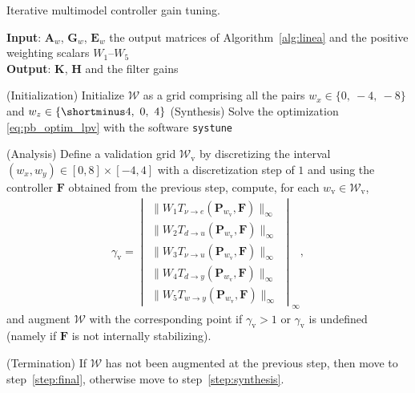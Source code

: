 \begin{algorithm}
  \caption{Iterative multimodel controller gain tuning.}
  \label{alg:iterativeOptimisation}
  \hspace*{.1cm} \textbf{Input}: $\boldsymbol{A}_{w}$, $\boldsymbol{G}_{w}$, $\boldsymbol{E}_{w}$  the output matrices of Algorithm~\ref{alg:linea} and the positive weighting scalars $W_1$--$W_5$\\
  \hspace*{.1cm} \textbf{Output}: $\boldsymbol{K}$, $\boldsymbol{H}$ and the filter gains
  \begin{algorithmic}[1]
   
    \State (Initialization) Initialize ${\mathcal W}$ as a grid comprising all the pairs $ w_{x} \in \{0,~-4,~-8\}$ and $ w_{z} \in \{\shortminus 4,~0,~4\}$
    \State \label{step:synthesis} (Synthesis) Solve the optimization \eqref{eq:pb_optim_lpv} with the software {\tt systune}

    \State \label{step:analysis} (Analysis) Define a validation grid ${\mathcal W}_{\text{v}}$ by discretizing the interval $(w_x,w_y) \in [0,8]\times[-4,4]$ with a discretization step of $1$ and 
    using the controller $\boldsymbol{F}$ obtained from the previous step, compute, for each $w_{\text{v}}\in {\mathcal W}_{\text{v}}$,
    \begin{align}
    \label{eq:validation_step}
    \gamma_{\text{v}} = \begin{vmatrix}
    \| W_{1} T_{\nu \rightarrow e}(\boldsymbol{P}_{w_{\text{v}}},\boldsymbol{F})\|_{\infty} \\
    \|W_{2} T_{d \rightarrow u}(\boldsymbol{P}_{w_{\text{v}}},\boldsymbol{F})\|_{\infty}\\
    \|W_{3} T_{\nu \rightarrow u}(\boldsymbol{P}_{w_{\text{v}}},\boldsymbol{F})\|_{\infty}\\
    \|W_{4} T_{d \rightarrow y}(\boldsymbol{P}_{w_{\text{v}}},\boldsymbol{F})\|_{\infty}\\
    \|W_{5} T_{w \rightarrow y}(\boldsymbol{P}_{w_{\text{v}}},\boldsymbol{F})\|_{\infty}
    \end{vmatrix}_{\infty} ,
    \end{align}
    and augment ${\mathcal W}$ with the corresponding point if $\gamma_{\text{v}} > 1$ or $\gamma_{\text{v}}$ is undefined (namely if $\boldsymbol{F}$ is not internally stabilizing).

    \State (Termination) If ${\mathcal W}$ has not been augmented at the previous step, then move to step~\ref{step:final}, otherwise move to step~\ref{step:synthesis}.
    

\end{algorithmic}
\end{algorithm}
